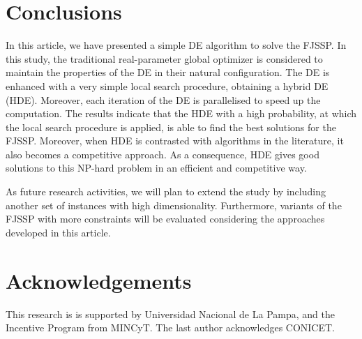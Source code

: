\documentclass[runningheads,a4paper]{llncs}
\begin{document}






\section{Conclusions}
\vspace{-0.4cm}
In this article, we have presented a simple DE algorithm to solve the FJSSP. In
this study, the traditional real-parameter global optimizer is considered to maintain the properties of the DE in their natural configuration. The DE is enhanced with a very simple local search procedure, obtaining a hybrid DE (HDE). Moreover, each iteration of the DE is parallelised to speed up the computation. The results indicate that the HDE with a high probability, at which the local search procedure is applied, is able to find the best solutions for the FJSSP. Moreover, when HDE is contrasted with algorithms in the literature, it also becomes a competitive approach. As a consequence, HDE gives good solutions to this NP-hard problem in an efficient and competitive way.

As future research activities, we will plan to extend the study by including another set of instances with high dimensionality. Furthermore, variants of the FJSSP with more constraints will be evaluated considering the approaches developed in this article.

\section*{Acknowledgements}
\vspace{-0.4cm}
This research is is supported by Universidad Nacional de La Pampa, and the Incentive Program from MINCyT. The last author acknowledges CONICET.

\scriptsize


\end{document}
